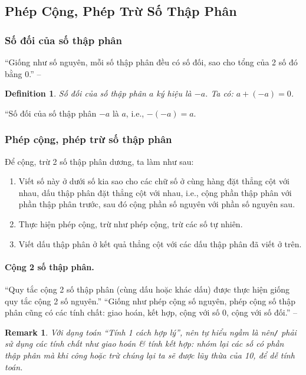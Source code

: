 \documentclass{article}
\numberwithin{equation}{section}
\newtheorem{definition}{Definition}[section]
\newtheorem{remark}{Remark}[section]
\begin{document}
\subsection{Phép Cộng, Phép Trừ Số Thập Phân}

\subsubsection{Số đối của số thập phân}
``Giống như số nguyên, mỗi số thập phân đều có số đối, sao cho tổng của 2 số đó bằng 0.'' -- \cite[p. 48]{Thai_Anh_Dat_Ha_Loan_Nam_Quang_Toan_6_tap_2}

\begin{definition}
	\emph{Số đối} của số thập phân $a$ ký hiệu là $-a$. Ta có: $a + (-a) = 0$.
\end{definition}
``Số đối của số thập phân $-a$ là $a$, i.e., $-(-a) = a$.

\subsubsection{Phép cộng, phép trừ số thập phân}
Để cộng, trừ 2 số thập phân dương, ta làm như sau:
\begin{enumerate}
	\item Viết số này ở dưới số kia sao cho các chữ số ở cùng hàng đặt thẳng cột với nhau, dấu thập phân đặt thẳng cột với nhau, i.e., cộng phần thập phân với phần thập phân trước, sau đó cộng phần số nguyên với phần số nguyên sau.
	\item Thực hiện phép cộng, trừ như phép cộng, trừ các số tự nhiên.
	\item Viết dấu thập phân ở kết quả thẳng cột với các dấu thập phân đã viết ở trên.
\end{enumerate}

\paragraph{Cộng 2 số thập phân.} ``Quy tắc cộng 2 số thập phân (cùng dấu hoặc khác dấu) được thực hiện giống quy tắc cộng 2 số nguyên.'' ``Giống như phép cộng số nguyên, phép cộng số thập phân cũng có các tính chất: giao hoán, kết hợp, cộng với số 0, cộng với số đối.'' -- \cite[p. 49]{Thai_Anh_Dat_Ha_Loan_Nam_Quang_Toan_6_tap_2}

\begin{remark}
	Với dạng toán ``Tính 1 cách hợp lý'', nên tự hiểu ngầm là nên\emph{\texttt{/}} phải sử dụng các tính chất như giao hoán \textit{\&} tính kết hợp: nhóm lại các số có phần thập phân mà khi công hoặc trừ chúng lại ta sẽ được lũy thừa của 10, để dễ tính toán.
\end{remark}
\end{document}
